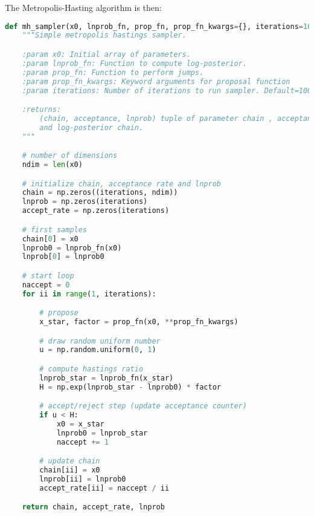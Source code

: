The Metropolis-Hasting algorithm is then:

\begin{lstlisting}[language=Python]
def mh_sampler(x0, lnprob_fn, prop_fn, prop_fn_kwargs={}, iterations=100000):
    """Simple metropolis hastings sampler.

    :param x0: Initial array of parameters.
    :param lnprob_fn: Function to compute log-posterior.
    :param prop_fn: Function to perform jumps.
    :param prop_fn_kwargs: Keyword arguments for proposal function
    :param iterations: Number of iterations to run sampler. Default=100000

    :returns:
        (chain, acceptance, lnprob) tuple of parameter chain , acceptance rate
        and log-posterior chain.
    """

    # number of dimensions
    ndim = len(x0)

    # initialize chain, acceptance rate and lnprob
    chain = np.zeros((iterations, ndim))
    lnprob = np.zeros(iterations)
    accept_rate = np.zeros(iterations)

    # first samples
    chain[0] = x0
    lnprob0 = lnprob_fn(x0)
    lnprob[0] = lnprob0

    # start loop
    naccept = 0
    for ii in range(1, iterations):

        # propose
        x_star, factor = prop_fn(x0, **prop_fn_kwargs)

        # draw random uniform number
        u = np.random.uniform(0, 1)

        # compute hastings ratio
        lnprob_star = lnprob_fn(x_star)
        H = np.exp(lnprob_star - lnprob0) * factor

        # accept/reject step (update acceptance counter)
        if u < H:
            x0 = x_star
            lnprob0 = lnprob_star
            naccept += 1

        # update chain
        chain[ii] = x0
        lnprob[ii] = lnprob0
        accept_rate[ii] = naccept / ii

    return chain, accept_rate, lnprob

\end{lstlisting}


		



